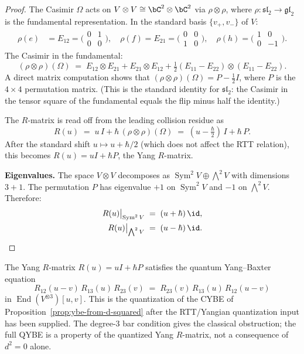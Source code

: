 \begin{proof}
The Casimir $\Omega$ acts on $V\otimes V\cong\bC^2\otimes\bC^2$
via $\rho\otimes\rho$, where $\rho:\mathfrak{sl}_2\to\mathfrak{gl}_2$ is
the fundamental representation. In the standard basis
$\{v_+,v_-\}$ of $V$:
\begin{align*}
\rho(e)&=E_{12}=\bigl(\begin{smallmatrix}0&1\\0&0\end{smallmatrix}\bigr),\quad
\rho(f)=E_{21}=\bigl(\begin{smallmatrix}0&0\\1&0\end{smallmatrix}\bigr),\quad
\rho(h)=\bigl(\begin{smallmatrix}1&0\\0&-1\end{smallmatrix}\bigr).
\end{align*}
The Casimir in the fundamental:
\[
(\rho\otimes\rho)(\Omega)
\;=\;E_{12}\otimes E_{21}+E_{21}\otimes E_{12}+\tfrac12(E_{11}-E_{22})\otimes(E_{11}-E_{22}).
\]
A direct matrix computation shows that
$(\rho\otimes\rho)(\Omega)=P-\tfrac12 I$, where $P$ is the
$4\times 4$ permutation matrix. (This is the standard identity for
$\mathfrak{sl}_2$: the Casimir in the tensor square of the
fundamental equals the flip minus half the identity.)

The $R$-matrix is read off from the leading collision residue as
\[
R(u)\;=\;u\,I+\hbar\,(\rho\otimes\rho)(\Omega)
\;=\;(u-\tfrac\hbar 2)\,I+\hbar\,P.
\]
After the standard shift $u\mapsto u+\hbar/2$ (which does not
affect the RTT relation), this becomes $R(u)=uI+\hbar P$, the Yang
$R$-matrix.

\textbf{Eigenvalues.} The space $V\otimes V$ decomposes as
$\operatorname{Sym}^2 V\oplus\bigwedge^2 V$ with dimensions $3+1$.
The permutation $P$ has eigenvalue $+1$ on $\operatorname{Sym}^2 V$
and $-1$ on $\bigwedge^2 V$. Therefore:
\begin{align}
R(u)\big|_{\operatorname{Sym}^2 V}&\;=\;(u+\hbar)\,\id,
\label{eq:r-eigenvalue-sym}\\
R(u)\big|_{\bigwedge^2 V}&\;=\;(u-\hbar)\,\id.
\label{eq:r-eigenvalue-wedge}
\end{align}
\end{proof}

\begin{remark}
The Yang $R$-matrix $R(u)=uI+\hbar P$ satisfies the quantum Yang--Baxter
equation
\[
R_{12}(u{-}v)\,R_{13}(u)\,R_{23}(v)
\;=\;R_{23}(v)\,R_{13}(u)\,R_{12}(u{-}v)
\]
in $\operatorname{End}(V^{\otimes 3})[u,v]$. This is the quantization
of the CYBE of Proposition~\ref{prop:ybe-from-d-squared} after the
RTT/Yangian quantization input has been supplied. The degree-$3$ bar
condition gives the classical obstruction; the full QYBE is a property
of the quantized Yang $R$-matrix, not a consequence of $d^2=0$ alone.
\end{remark}

